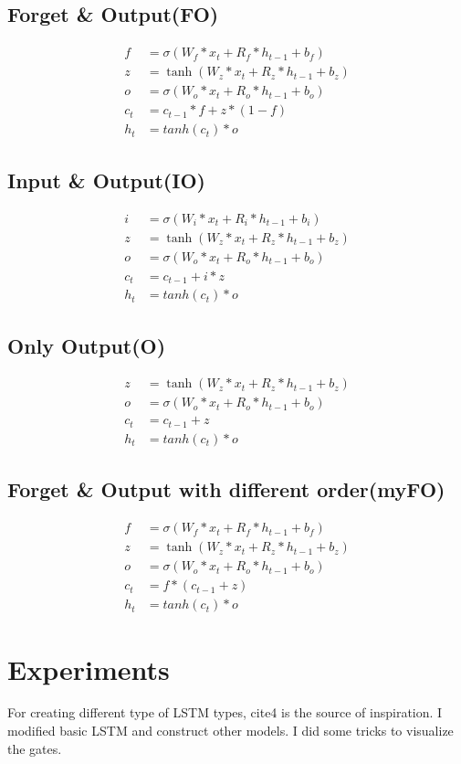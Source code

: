 \documentclass[12pt, letterpaper]{article}
\begin{document}
\subsection{Forget \& Output(FO)}
\begin{align*}
	f &= \sigma(W_f * x_{t} + R_f * h_{t-1} + b_f) \\
	z &= \tanh(W_z * x_{t} + R_z * h_{t-1} + b_z) \\ 
	o &= \sigma(W_o * x_{t} + R_o * h_{t-1} + b_o) \\
	c_t &= c_{t-1} * f + z * (1-f) \\
	h_t &= tanh(c_t) * o
\end{align*}
\subsection{Input \& Output(IO)}
\begin{align*}
	i &= \sigma(W_i * x_{t} + R_i * h_{t-1} + b_i) \\
	z &= \tanh(W_z * x_{t} + R_z * h_{t-1} + b_z) \\ 
	o &= \sigma(W_o * x_{t} + R_o * h_{t-1} + b_o) \\
	c_t &= c_{t-1} + i * z  \\
	h_t &= tanh(c_t) * o
\end{align*}
\subsection{Only Output(O)}
\begin{align*}
	z &= \tanh(W_z * x_{t} + R_z * h_{t-1} + b_z) \\ 
	o &= \sigma(W_o * x_{t} + R_o * h_{t-1} + b_o) \\
	c_t &= c_{t-1} + z  \\
	h_t &= tanh(c_t) * o
\end{align*}
\subsection{Forget \& Output with different order(myFO)}
\begin{align*}
	f &= \sigma(W_f * x_{t} + R_f * h_{t-1} + b_f) \\
	z &= \tanh(W_z * x_{t} + R_z * h_{t-1} + b_z) \\ 
	o &= \sigma(W_o * x_{t} + R_o * h_{t-1} + b_o) \\
	c_t &= f * (c_{t-1} + z)  \\
	h_t &= tanh(c_t) * o
\end{align*}
\section{Experiments}
	For creating different type of LSTM types, cite{4} is the source of inspiration. I modified basic LSTM and construct other models. I did some tricks to visualize the gates.
\end{document}
